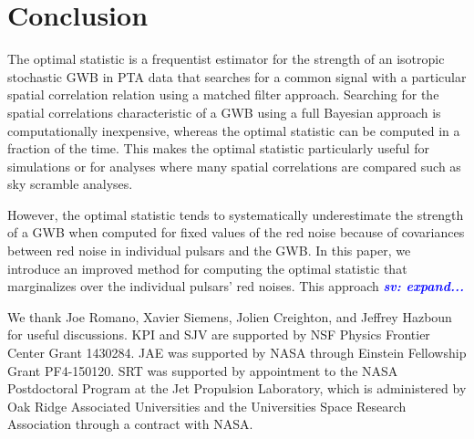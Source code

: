 \documentclass[twocolumn,aps,prd,superscriptaddress]{revtex4-1}
\newcommand{\sv}[1]{\textcolor{blue}{\it{\textbf{sv: #1}}} }
\begin{document}
\section{Conclusion}
\label{sec:conclusion}

The optimal statistic is a frequentist estimator for the strength of 
an isotropic stochastic GWB in PTA data that searches 
for a common signal with a particular spatial correlation relation 
using a matched filter approach. 
Searching for the spatial correlations characteristic of a GWB 
using a full Bayesian approach is computationally inexpensive, 
whereas the optimal statistic can be computed in a fraction of the time. 
This makes the optimal statistic particularly useful for simulations 
or for analyses where many spatial correlations are compared 
such as sky scramble analyses.

However, the optimal statistic tends to systematically underestimate the strength of a GWB 
when computed for fixed values of the red noise because of 
covariances between red noise in individual pulsars and the GWB. 
In this paper, we introduce an improved method for computing the optimal statistic 
that marginalizes over the individual pulsars' red noises. 
This approach \sv{expand...}


\acknowledgments
We thank Joe Romano, Xavier Siemens, Jolien Creighton, and Jeffrey Hazboun for useful discussions. 
KPI and SJV are supported by NSF Physics Frontier Center Grant 1430284.
JAE was supported by NASA through Einstein Fellowship Grant PF4-150120. 
SRT was supported by appointment to the NASA Postdoctoral Program 
at the Jet Propulsion Laboratory, which is administered by Oak Ridge Associated Universities 
and the Universities Space Research Association through a contract with NASA. 




\end{document}
